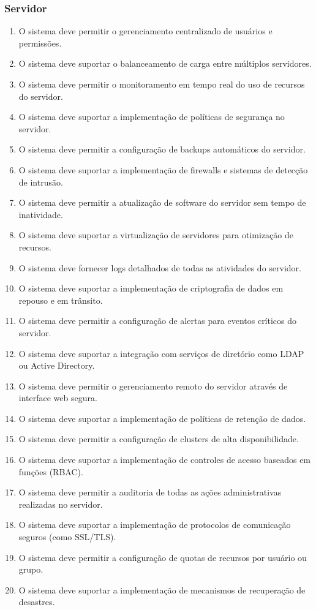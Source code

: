 \subsubsection{Servidor}
\begin{enumerate}
  \item O sistema deve permitir o gerenciamento centralizado de usuários e permissões.
  \item O sistema deve suportar o balanceamento de carga entre múltiplos servidores.
  \item O sistema deve permitir o monitoramento em tempo real do uso de recursos do servidor.
  \item O sistema deve suportar a implementação de políticas de segurança no servidor.
  \item O sistema deve permitir a configuração de backups automáticos do servidor.
  \item O sistema deve suportar a implementação de firewalls e sistemas de detecção de intrusão.
  \item O sistema deve permitir a atualização de software do servidor sem tempo de inatividade.
  \item O sistema deve suportar a virtualização de servidores para otimização de recursos.
  \item O sistema deve fornecer logs detalhados de todas as atividades do servidor.
  \item O sistema deve suportar a implementação de criptografia de dados em repouso e em trânsito.
  \item O sistema deve permitir a configuração de alertas para eventos críticos do servidor.
  \item O sistema deve suportar a integração com serviços de diretório como LDAP ou Active Directory.
  \item O sistema deve permitir o gerenciamento remoto do servidor através de interface web segura.
  \item O sistema deve suportar a implementação de políticas de retenção de dados.
  \item O sistema deve permitir a configuração de clusters de alta disponibilidade.
  \item O sistema deve suportar a implementação de controles de acesso baseados em funções (RBAC).
  \item O sistema deve permitir a auditoria de todas as ações administrativas realizadas no servidor.
  \item O sistema deve suportar a implementação de protocolos de comunicação seguros (como SSL/TLS).
  \item O sistema deve permitir a configuração de quotas de recursos por usuário ou grupo.
  \item O sistema deve suportar a implementação de mecanismos de recuperação de desastres.
\end{enumerate}

